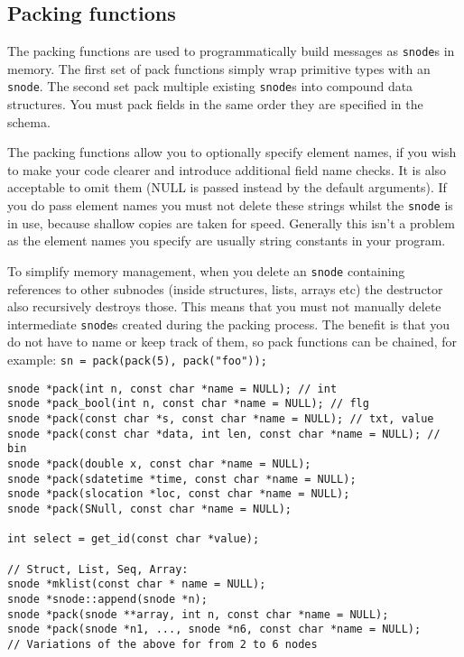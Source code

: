 \documentclass[12pt,a4paper,twoside]{article}
\renewcommand{\_}{\texttt{\symbol{95}}}
\begin{document}
\subsection{Packing functions}

The packing functions are used to programmatically build messages as
\verb^snode^s in memory. The first set of pack functions simply wrap primitive
types with an \verb^snode^. The second set pack multiple existing
\verb^snode^s into compound data structures. You must pack fields
in the same order they are specified in the schema.

The packing functions allow you to optionally specify element
names, if you wish to make your code clearer and introduce additional
field name checks. It is also acceptable to omit them (NULL is passed
instead by the default arguments). If you do pass element names
you must not delete these strings whilst the \verb^snode^ is in use,
because shallow copies are taken for speed. Generally this isn't
a problem as the element names you specify are usually string constants
in your program.

To simplify memory management, when you delete an \verb^snode^ containing
references to other subnodes (inside structures, lists, arrays etc)
the destructor also recursively destroys those. This means that you must
not manually delete intermediate \verb^snode^s created during the
packing process. The benefit is that you do not have to name or
keep track of them, so pack functions can be chained, for example:
\verb^sn = pack(pack(5), pack("foo"));^

\begin{verbatim}
snode *pack(int n, const char *name = NULL); // int
snode *pack_bool(int n, const char *name = NULL); // flg
snode *pack(const char *s, const char *name = NULL); // txt, value
snode *pack(const char *data, int len, const char *name = NULL); // bin
snode *pack(double x, const char *name = NULL);
snode *pack(sdatetime *time, const char *name = NULL);
snode *pack(slocation *loc, const char *name = NULL);
snode *pack(SNull, const char *name = NULL);

int select = get_id(const char *value);

// Struct, List, Seq, Array:
snode *mklist(const char * name = NULL);
snode *snode::append(snode *n);
snode *pack(snode **array, int n, const char *name = NULL);
snode *pack(snode *n1, ..., snode *n6, const char *name = NULL);
// Variations of the above for from 2 to 6 nodes
\end{verbatim}
\end{document}
